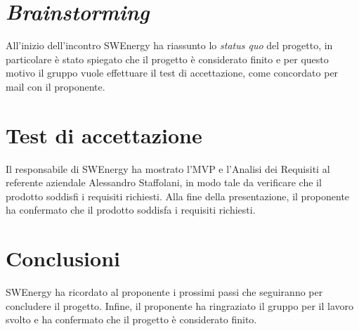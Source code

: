 \section{\textit{Brainstorming}}

All'inizio dell'incontro SWEnergy ha riassunto lo \textit{status quo} del
progetto, in particolare è stato spiegato che il progetto è considerato finito e
per questo motivo il gruppo vuole effettuare il test di accettazione, come
concordato per mail con il proponente.

\section{Test di accettazione}

Il responsabile di SWEnergy ha mostrato l'MVP e l'Analisi dei Requisiti al referente aziendale Alessandro 
Staffolani, in modo tale da verificare che il prodotto soddisfi i requisiti
richiesti. Alla fine della presentazione, il proponente ha confermato che il
prodotto soddisfa i requisiti richiesti.

\section{Conclusioni}

SWEnergy ha ricordato al proponente i prossimi passi che seguiranno per
concludere il progetto. Infine, il proponente ha ringraziato il gruppo per il
lavoro svolto e ha confermato che il progetto è considerato finito.
